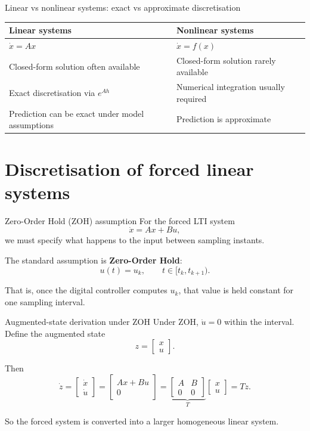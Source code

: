 \documentclass[aspectratio=169,10pt]{beamer}
\begin{document}
\begin{frame}{Linear vs nonlinear systems: exact vs approximate discretisation}
\begin{center}
\renewcommand{\arraystretch}{1.35}
\begin{tabular}{|p{}|p{}|}
\hline
\textbf{Linear systems} & \textbf{Nonlinear systems}\\
\hline
\(\dot{x}=Ax\) & \(\dot{x}=f(x)\)\\
Closed-form solution often available & Closed-form solution rarely available\\
Exact discretisation via \(e^{Ah}\) & Numerical integration usually required\\
Prediction can be exact under model assumptions & Prediction is approximate\\
\hline
\end{tabular}
\end{center}
\end{frame}

\section{Discretisation of forced linear systems}

\begin{frame}{Zero-Order Hold (ZOH) assumption}
For the forced LTI system
\[
\dot{x}=Ax+Bu,
\]
we must specify what happens to the input between sampling instants.

The standard assumption is \textbf{Zero-Order Hold}:
\[
u(t)=u_k,\qquad t\in[t_k,t_{k+1}).
\]

That is, once the digital controller computes \(u_k\), that value is held constant for one sampling interval.
\end{frame}

\begin{frame}{Augmented-state derivation under ZOH}
Under ZOH, \(\dot{u}=0\) within the interval.
Define the augmented state
\[
z=
\begin{bmatrix}
x\\u
\end{bmatrix}.
\]

Then
\[
\dot{z}
=
\begin{bmatrix}
\dot{x}\\
\dot{u}
\end{bmatrix}
=
\begin{bmatrix}
Ax+Bu\\
0
\end{bmatrix}
=
\underbrace{
\begin{bmatrix}
A & B\\
0 & 0
\end{bmatrix}}_{T}
\begin{bmatrix}
x\\u
\end{bmatrix}
=
Tz.
\]

So the forced system is converted into a larger homogeneous linear system.
\end{frame}
\end{document}
